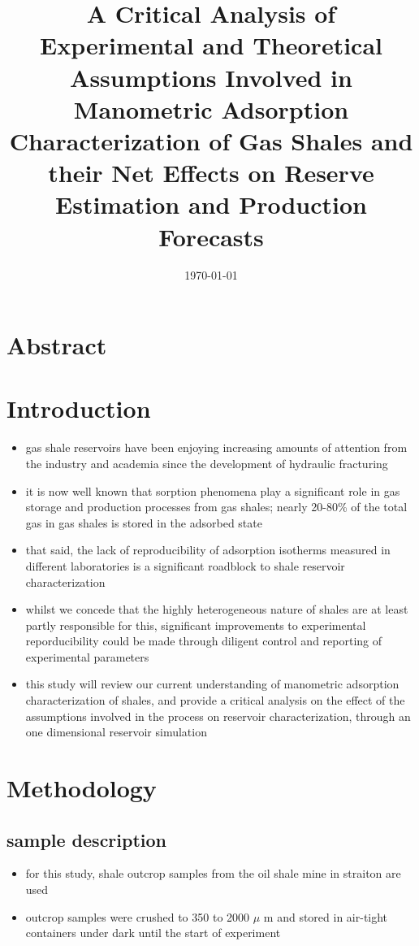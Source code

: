 \documentclass[11pt]{article}
\date{\today}
\title{A Critical Analysis of Experimental and Theoretical Assumptions Involved in Manometric Adsorption Characterization of Gas Shales and their Net Effects on Reserve Estimation and Production Forecasts}
\begin{document}
\maketitle
\tableofcontents


\section{Abstract}
\label{sec:org0c602fb}
\section{Introduction}
\label{sec:org62ff133}
\begin{itemize}
\item gas shale reservoirs have been enjoying increasing amounts of attention from the industry and academia since the development of hydraulic fracturing \cite{king2010}
\item it is now well known that sorption phenomena play a significant role in gas storage and production processes from gas shales; nearly 20-80\% of the total gas in gas shales is stored in the adsorbed state \cite{schettlerjr1991}
\item that said, the lack of reproducibility of adsorption isotherms measured in different laboratories is a significant roadblock to shale reservoir characterization
\item whilst we concede that the highly heterogeneous nature of shales are at least partly responsible for this, significant improvements to experimental reporducibility could be made through diligent control and reporting of experimental parameters
\item this study will review our current understanding of manometric adsorption characterization of shales, and provide a critical analysis on the effect of the assumptions involved in the process on reservoir characterization, through an one dimensional reservoir simulation
\end{itemize}
\section{Methodology}
\label{sec:orga58f002}
\subsection{sample description}
\label{sec:org781e7c3}
\begin{itemize}
\item for this study, shale outcrop samples from the oil shale mine in straiton are used
\item outcrop samples were crushed to 350 to 2000 \(\mu\) m and stored in air-tight containers under dark until the start of experiment
\end{itemize}
\end{document}
